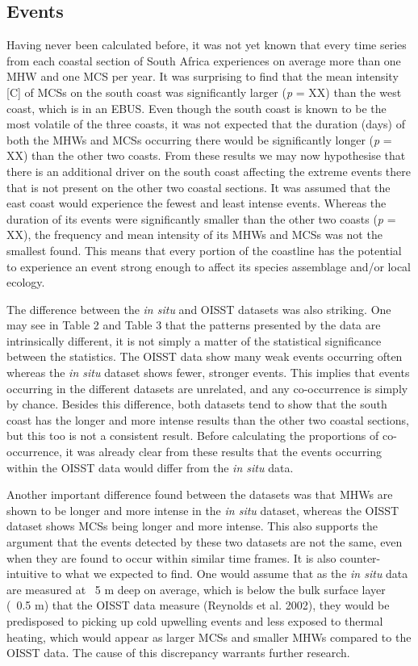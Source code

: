 \documentclass[a4paper,10pt,review]{elsarticle}
\begin{document}
\subsection{Events}
Having never been calculated before, it was not yet known that every time series from each coastal section of South Africa experiences on average more than one MHW and one MCS per year. It was surprising to find that the mean intensity [\degree C] of MCSs on the south coast was significantly larger (\emph{p} = XX) than the west coast, which is in an EBUS. Even though the south coast is known to be the most volatile of the three coasts, it was not expected that the duration (days) of both the MHWs and MCSs occurring there would be significantly longer (\emph{p} = XX) than the other two coasts. From these results we may now hypothesise that there is an additional driver on the south coast affecting the extreme events there that is not present on the other two coastal sections. It was assumed that the east coast would experience the fewest and least intense events. Whereas the duration of its events were significantly smaller than the other two coasts (\emph{p} = XX), the frequency and mean intensity of its MHWs and MCSs was not the smallest found. This means that every portion of the coastline has the potential to experience an event strong enough to affect its species assemblage and/or local ecology.

The difference between the \emph{in situ} and OISST datasets was also striking. One may see in Table 2 and Table 3 that the patterns presented by the data are intrinsically different, it is not simply a matter of the statistical significance between the statistics. The OISST data show many weak events occurring often whereas the \emph{in situ} dataset shows fewer, stronger events. This implies that events occurring in the different datasets are unrelated, and any co-occurrence is simply by chance. Besides this difference, both datasets tend to show that the south coast has the longer and more intense results than the other two coastal sections, but this too is not a consistent result. Before calculating the proportions of co-occurrence, it was already clear from these results that the events occurring within the OISST data would differ from the \emph{in situ} data.

Another important difference found between the datasets was that MHWs are shown to be longer and more intense in the \emph{in situ} dataset, whereas the OISST dataset shows MCSs being longer and more intense. This also supports the argument that the events detected by these two datasets are not the same, even when they are found to occur within similar time frames. It is also counter-intuitive to what we expected to find. One would assume that as the \emph{in situ} data are measured at ~5 m deep on average, which is below the bulk surface layer (~0.5 m) that the OISST data measure (Reynolds et al. 2002), they would be predisposed to picking up cold upwelling events and less exposed to thermal heating, which would appear as larger MCSs and smaller MHWs compared to the OISST data. The cause of this discrepancy warrants further research.
\end{document}
